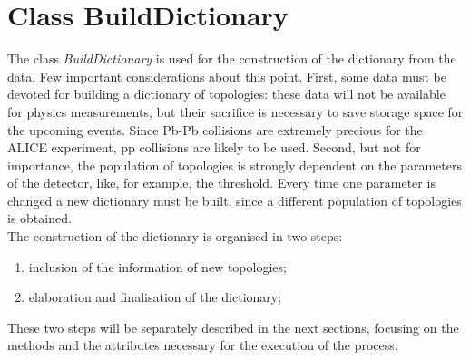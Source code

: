 \section{Class BuildDictionary}
The class \textit{BuildDictionary} is used for the construction of the dictionary from the data. Few important considerations about this point. First, some data must be devoted for building a dictionary of topologies: these data will not be available for physics measurements, but their sacrifice is necessary to save storage space for the upcoming events. Since Pb-Pb collisions are extremely precious for the ALICE experiment, pp collisions are likely to be used. Second, but not for importance, the population of topologies is strongly dependent on the parameters of the detector, like, for example, the threshold. Every time one parameter is changed a new dictionary must be built, since a different population of topologies is obtained.\\
The construction of the dictionary is organised in two steps:
\begin{enumerate}
 \item inclusion of the information of new topologies;
 \item elaboration and finalisation of the dictionary;
\end{enumerate}
These two steps will be separately described in the next sections, focusing on the methods and the attributes necessary for the execution of the process.
